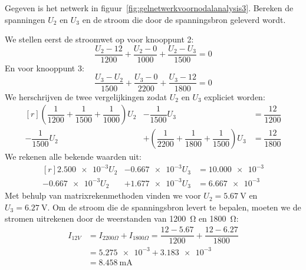 \begin{example}
Gegeven is het netwerk in figuur~\ref{fig:gelnetwerkvoornodalanalysis3}. Bereken de spanningen $U_2$ en $U_3$ en de stroom die door de spanningsbron geleverd wordt.
\begin{center}
\label{fig:gelnetwerkvoornodalanalysis3}
\end{center}
We stellen eerst de stroomwet op voor knooppunt 2:
%
\begin{equation}
\dfrac{U_2-12}{1200} + \dfrac{U_2-0}{1000} + \dfrac{U_2-U_3}{1500} = 0
\end{equation}
%
En voor knooppunt 3:
%
\begin{equation}
\dfrac{U_3-U_2}{1500} + \dfrac{U_3-0}{2200} + \dfrac{U_3-12}{1800} = 0
\end{equation}
%
We herschrijven de twee vergelijkingen zodat $U_2$ en $U_3$ expliciet worden:
%
\begin{equation}
\begin{matrix*}[r]
\left(\dfrac{1}{1200} + \dfrac{1}{1500} + \dfrac{1}{1000}\right)U_2 & - \dfrac{1}{1500}U_3 &= \dfrac{12}{1200} \\[1em]
- \dfrac{1}{1500}U_2 & + \left(\dfrac{1}{2200} + \dfrac{1}{1800} + \dfrac{1}{1500}\right)U_3 & = \dfrac{12}{1800}
\end{matrix*}
\end{equation}
%
We rekenen alle bekende waarden uit:
%
\begin{equation}
\begin{matrix*}[r]
\num{2.500e-3}U_2 & -\num{0.667e-3}U_3 &= \num{10.000e-3} \\
\num{-0.667e-3}U_2 & + \num{1,677e-3}U_3 &= \num{6.667e-3}
\end{matrix*}
\end{equation}
%
Met behulp van matrixrekenmethoden vinden we voor $U_2 = \SI{5.67}{\volt}$ en $U_3 = \SI{6.27}{\volt}$.
Om de stroom die de spanningsbron levert te bepalen, moeten we de stromen uitrekenen door de weerstanden van \SI{1200}{\ohm} en \SI{1800}{\ohm}:
\begin{equation}
\begin{split}
I_{12V} &= I_{2200\Omega} + I_{1800\Omega} = \dfrac{12-\num{5.67}}{1200} + \dfrac{12-\num{6.27}}{1800} \\
        &= \num{5.275e-3}+\num{3,183e-3} \\
        &= \SI{8,458}{\mA}
\end{split}
\end{equation}
\end{example}

